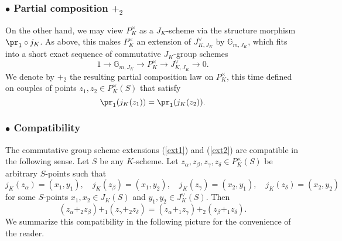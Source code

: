 \documentclass[11pt,oneside]{amsart}
\theoremstyle{plain}
\theoremstyle{definition}
\def\lra{{\longrightarrow}}
\def\G{{\bf G}}
\DeclareMathOperator{\spec}{Spec} \DeclareMathOperator{\sgn}{sign}
\def\G{\mathbb{G}}
\begin{document}
  \subsubsection*{$\bullet$ Partial composition $+_2$} 
     On the other hand, we may view $P_K^\times$ as a  $J_K$-scheme via the structure morphism $\pr_1\circ j_K$. As above, this makes  $P_K^\times$ an extension of $J^\vee_{K, J_K}$ by $\G_{m, J_K}$, %
    which fits into a short exact sequence of commutative $J_K$-group schemes
    \begin{equation}\label{ext2}
        1 \lra \G_{m, J_K} \lra P_K^\times \lra J^\vee_{K, J_K} \lra 0.
    \end{equation} 
   We denote by $+_2$ the resulting partial composition law on $P_K^\times$, this time defined on couples of points $z_1, z_2 \in P_K^\times(S)$ that satisfy 
    \[ \pr_1(j_K(z_1))=\pr_1(j_K(z_2)). \]
    
   \subsubsection*{$\bullet$ Compatibility} 
    The commutative group scheme extensions (\ref{ext1}) and (\ref{ext2}) are compatible in the following sense. Let $S$ be any $K$-scheme. Let $z_\alpha, z_\beta, z_\gamma, z_\delta \in P_K^\times (S)$ be arbitrary   $S$-points such that 
    $$j_K(z_\alpha) = (x_1, y_1), \quad j_K(z_\beta) = (x_1, y_2), \quad j_K(z_\gamma) = (x_2, y_1), \quad j_K(z_\delta) = (x_2, y_2)$$
     for some $S$-points $x_1, x_2\in J_K(S)$ and $y_1, y_2\in J_K^\vee(S)$. Then
    \begin{equation}
        (z_\alpha +_2 z_\beta)+_1 (z_\gamma +_2 z_\delta)=(z_\alpha+_1 z_\gamma)+_2 (z_\beta +_1 z_\delta).
    \end{equation}
We summarize this compatibility in the following picture for the convenience of the reader. 
\end{document}
